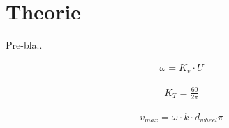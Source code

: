 \chapter{Theorie}
	Pre-bla..

	\begin{align}
		\omega = K_v \cdot U
		\label{eq:kv rating}
	\end{align}

	\begin{align}
		K_T = \frac{60}{2\pi}
	\end{align}

	\begin{align}
		v_{max} = \omega \cdot k \cdot d_{wheel}\pi
	\end{align}